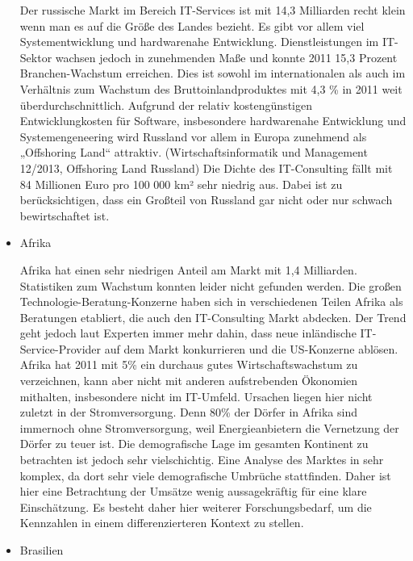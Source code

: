 \begin{itemize}
Der russische Markt im Bereich IT-Services ist mit 14,3 Milliarden recht klein wenn man es auf die Größe des Landes bezieht. Es gibt vor allem viel Systementwicklung und hardwarenahe Entwicklung. Dienstleistungen im IT-Sektor wachsen jedoch in zunehmenden Maße und konnte 2011 15,3 Prozent Branchen-Wachstum erreichen. Dies ist sowohl im internationalen als auch im Verhältnis zum Wachstum des Bruttoinlandproduktes mit 4,3 \% in 2011 weit überdurchschnittlich. \cite{statRus2} Aufgrund der relativ kostengünstigen Entwicklungkosten für Software, insbesondere hardwarenahe Entwicklung und Systemengeneering wird Russland vor allem in Europa  zunehmend als „Offshoring Land“ attraktiv. (Wirtschaftsinformatik und Management 12/2013, Offshoring Land Russland)
Die Dichte des IT-Consulting fällt mit 84 Millionen Euro pro 100 000 km² sehr niedrig aus. Dabei ist zu berücksichtigen, dass ein Großteil von Russland gar nicht oder nur schwach bewirtschaftet ist. \cite{statRus}

 \newline
 \newline
\item {Afrika}

Afrika hat einen sehr niedrigen Anteil am Markt mit 1,4 Milliarden. \cite{statAfr} Statistiken zum Wachstum konnten leider nicht gefunden werden. Die großen Technologie-Beratung-Konzerne haben sich in verschiedenen Teilen Afrika als Beratungen etabliert, die auch den IT-Consulting Markt abdecken. Der Trend geht jedoch laut Experten immer mehr dahin, dass neue inländische IT-Service-Provider auf dem Markt konkurrieren und die US-Konzerne ablösen. Afrika hat 2011 mit 5\% ein durchaus gutes Wirtschaftswachstum zu verzeichnen, kann aber nicht mit anderen aufstrebenden Ökonomien mithalten, insbesondere nicht im IT-Umfeld. \cite{statAfr2}
Ursachen liegen hier nicht zuletzt in der Stromversorgung. Denn 80\% der Dörfer in Afrika sind immernoch ohne Stromversorgung, weil Energieanbietern die Vernetzung der Dörfer zu teuer ist.  \cite{dieZeit}
Die demografische Lage im gesamten Kontinent zu betrachten ist jedoch sehr vielschichtig. Eine Analyse des Marktes in sehr komplex, da dort sehr viele demografische Umbrüche stattfinden. Daher ist hier eine Betrachtung der Umsätze wenig aussagekräftig für eine klare Einschätzung. Es besteht daher hier weiterer Forschungsbedarf, um die Kennzahlen in einem differenzierteren  Kontext zu stellen.

 \newline
 \newline
\item {Brasilien}


\end{itemize}
